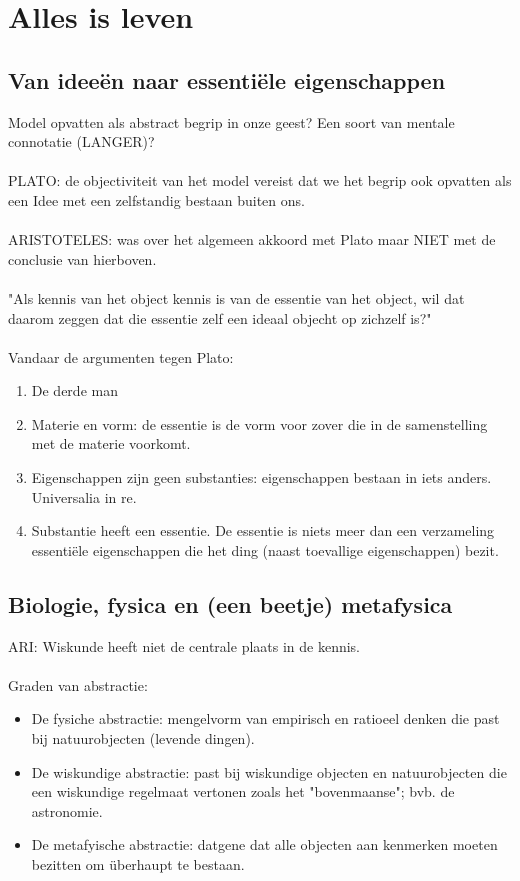 \section{Alles is leven}
\subsection{Van idee\"en naar essenti\"ele eigenschappen}
Model opvatten als abstract begrip in onze geest? Een soort van mentale connotatie (LANGER)?
\\
\\
PLATO: de objectiviteit van het model vereist dat we het begrip ook opvatten als een Idee met een zelfstandig bestaan buiten ons.
\\
\\
ARISTOTELES: was over het algemeen akkoord met Plato maar NIET met de conclusie van hierboven.
\\
\\
"Als kennis van het object kennis is van de essentie van het object, wil dat daarom zeggen dat die essentie zelf een ideaal objecht op zichzelf is?"
\\
\\
Vandaar de argumenten tegen Plato:
\begin{enumerate}
\item De derde man
\item Materie en vorm: de essentie is de vorm voor zover die in de samenstelling met de materie voorkomt.
\item Eigenschappen zijn geen substanties: eigenschappen bestaan in iets anders. Universalia in re.
\item Substantie heeft een essentie. De essentie is niets meer dan een verzameling essenti\"ele eigenschappen die het ding (naast toevallige eigenschappen) bezit.
\end{enumerate}


\subsection{Biologie, fysica en (een beetje) metafysica}
ARI: Wiskunde heeft niet de centrale plaats in de kennis. 
\\
\\
Graden van abstractie:
\begin{itemize}
\item De fysiche abstractie: mengelvorm van empirisch en ratioeel denken die past bij natuurobjecten (levende dingen).
\item De wiskundige abstractie: past bij wiskundige objecten en natuurobjecten die een wiskundige regelmaat vertonen zoals het "bovenmaanse"; bvb. de astronomie.
\item De metafyische abstractie: datgene dat alle objecten aan kenmerken moeten bezitten om \"uberhaupt te bestaan.

\end{itemize}

